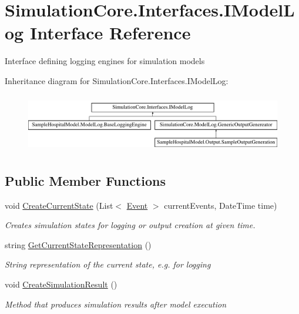 \hypertarget{interface_simulation_core_1_1_interfaces_1_1_i_model_log}{}\section{Simulation\+Core.\+Interfaces.\+I\+Model\+Log Interface Reference}
\label{interface_simulation_core_1_1_interfaces_1_1_i_model_log}


Interface defining logging engines for simulation models  


Inheritance diagram for Simulation\+Core.\+Interfaces.\+I\+Model\+Log\+:\begin{figure}[H]
\begin{center}
\leavevmode
\includegraphics[height=2.576687cm]{interface_simulation_core_1_1_interfaces_1_1_i_model_log}
\end{center}
\end{figure}
\subsection*{Public Member Functions}
\begin{DoxyCompactItemize}
\item 
void \hyperlink{interface_simulation_core_1_1_interfaces_1_1_i_model_log_abe26d0471005919fa89bf521da3956df}{Create\+Current\+State} (List$<$ \hyperlink{class_simulation_core_1_1_h_c_c_m_elements_1_1_event}{Event} $>$ current\+Events, Date\+Time time)
\begin{DoxyCompactList}\small\item\em Creates simulation states for logging or output creation at given time. \end{DoxyCompactList}\item 
string \hyperlink{interface_simulation_core_1_1_interfaces_1_1_i_model_log_ae0e08b44e470b395ecb1837ac65454b6}{Get\+Current\+State\+Representation} ()
\begin{DoxyCompactList}\small\item\em String representation of the current state, e.\+g. for logging \end{DoxyCompactList}\item 
void \hyperlink{interface_simulation_core_1_1_interfaces_1_1_i_model_log_a83c413b90acea0224ac139f1640953ed}{Create\+Simulation\+Result} ()
\begin{DoxyCompactList}\small\item\em Method that produces simulation results after model execution \end{DoxyCompactList}\end{DoxyCompactItemize}



